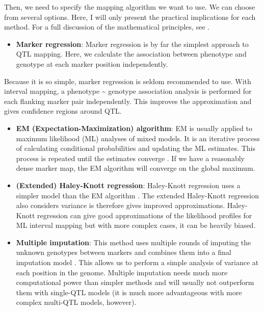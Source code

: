 \documentclass[12pt,]{krantz}
\newenvironment{Shaded}{\begin{snugshade}}{\end{snugshade}}
\newcommand{\NormalTok}[1]{{#1}}
\providecommand{\tightlist}{%
  \setlength{\itemsep}{0pt}\setlength{\parskip}{0pt}}
\begin{document}
\begin{Shaded}
\end{Shaded}

Then, we need to specify the mapping algorithm we want to use. We can
choose from several options. Here, I will only present the practical
implications for each method. For a full discussion of the mathematical
principles, see \citet{lynch1998genetics}.

\begin{itemize}
\tightlist
\item
  \textbf{Marker regression}: Marker regression is by far the simplest
  approach to QTL mapping. Here, we calculate the association between
  phenotype and genotype at each marker position independently.
\end{itemize}

Because it is so simple, marker regression is seldom recommended to use.
With interval mapping, a phenotype \textasciitilde{} genotype
association analysis is performed for each flanking marker pair
independently. This improves the approximation and gives confidence
regions around QTL.

\begin{itemize}
\tightlist
\item
  \textbf{EM (Expectation-Maximization) algorithm}: EM is usually
  applied to maximum likelihood (ML) analyses of mixed models. It is an
  iterative process of calculating conditional probabilities and
  updating the ML estimates. This process is repeated until the
  estimates converge \citep{Lander185}. If we have a reasonably dense
  marker map, the EM algorithm will converge on the global maximum.
\item
  \textbf{(Extended) Haley-Knott regression}: Haley-Knott regression
  uses a simpler model than the EM algorithm \citep{Haley1992}. The
  extended Haley-Knott regression also considers variance is therefore
  gives improved approximations. Haley-Knott regression can give good
  approximations of the likelihood profiles for ML interval mapping but
  with more complex cases, it can be heavily biased.
\item
  \textbf{Multiple imputation}: This method uses multiple rounds of
  imputing the unknown genotypes between markers and combines them into
  a final imputation model \citep{Sen371}. This allows us to perform a
  simple analysis of variance at each position in the genome. Multiple
  imputation needs much more computational power than simpler methods
  and will usually not outperform them with single-QTL models (it is
  much more advantageous with more complex multi-QTL models, however).
\end{itemize}
\end{document}

